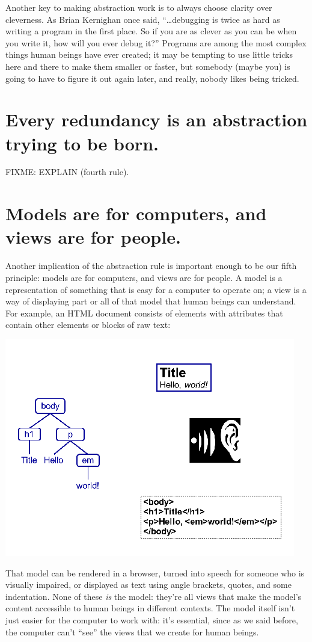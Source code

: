 \documentclass[10pt,letterpaper]{article}
\newcommand{\rulemajor}[1]{\section{#1}}
\begin{document}
Another key to making abstraction work is to always choose clarity over
cleverness.  As Brian Kernighan once said, ``{\ldots}debugging is twice as hard
as writing a program in the first place.  So if you are as clever as you can be
when you write it, how will you ever debug it?''  Programs are among the most
complex things human beings have ever created; it may be tempting to use little
tricks here and there to make them smaller or faster, but somebody (maybe you)
is going to have to figure it out again later, and really, nobody likes being
tricked.

\rulemajor{Every redundancy is an abstraction trying to be born.}

FIXME: EXPLAIN (fourth rule).

\rulemajor{Models are for computers, and views are for people.}

Another implication of the abstraction rule is important enough to be our fifth
principle: models are for computers, and views are for people.  A model is a
representation of something that is easy for a computer to operate on; a view is
a way of displaying part or all of that model that human beings can understand.
For example, an HTML document consists of elements with attributes that contain
other elements or blocks of raw text:

\includegraphics{modelview.png}

That model can be rendered in a browser, turned into speech for someone who is
visually impaired, or displayed as text using angle brackets, quotes, and some
indentation.  None of these \emph{is} the model: they're all views that make the
model's content accessible to human beings in different contexts.  The model
itself isn't just easier for the computer to work with: it's essential, since as
we said before, the computer can't ``see'' the views that we create for human
beings.
\end{document}
